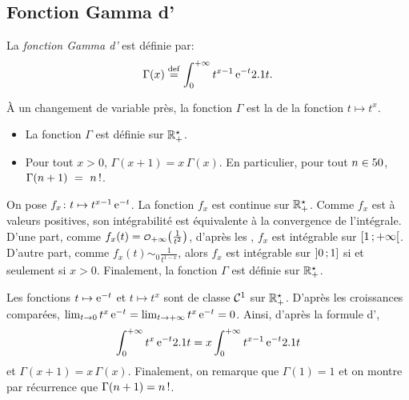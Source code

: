 \subsection{Fonction Gamma d'}\label{subsec:FonctionGammaEuler}

%    

\begin{defi}
    La \emph{fonction Gamma d'} est définie par: 
    $$\Gamma(x) \defeq \int_{0}^{+\infty} t^{x-1} \, \e^{-t} \d t.$$
\end{defi}

\begin{remarque}
    À un changement de variable près, la fonction $\Gamma$ est la  de la fonction $t \mapsto t^x$. 
\end{remarque} 

\begin{theo}
\begin{itemize}
\item La fonction $\Gamma$ est définie sur $\Rpe$.
\item Pour tout $x > 0$, $\Gamma(x+1) = x \, \Gamma(x)$.
En particulier, pour tout $n \in \N$, $\Gamma(n+1)~=~\fact{n}$. 
\end{itemize}
\end{theo}

\begin{demo}
On pose $\fonctionligne[f_x]{t}{t^{x - 1} \, \e^{-t}}$. La fonction $f_x$ est continue sur $\Rpe$. Comme $f_x$ est à valeurs positives, son intégrabilité est équivalente à la convergence de l'intégrale. \\
D'une part, comme $f_x(t) = \petito_{+\infty}\mathopen{}\left(\frac{1}{t^2}\right)$, d'après les , $f_x$ est intégrable sur $\interfo{1}{+\infty}$. D'autre part, comme $f_x(t) \sim_0 \frac{1}{t^{1-x}}$, alors $f_x$ est intégrable sur $\interof{0}{1}$ si et seulement si $x > 0$. Finalement, la fonction $\Gamma$ est définie sur $\Rpe$. 

Les fonctions $t \mapsto \e^{-t}$ et $t \mapsto t^x$ sont de classe $\Cont^1$ sur $\Rpe$. D'après les croissances comparées, $\lim_{t\to0} t^x \, \e^{-t} = \lim_{t\to+\infty} t^x \, \e^{-t} = 0$. Ainsi, d'après la formule d',
\[
\int_0^{+\infty} t^x \, \e^{-t} \d t = x \int_0^{+\infty} t^{x-1} \, \e^{-t} \d t
\]
et $\Gamma(x+1) = x \, \Gamma(x)$. Finalement, on remarque que $\Gamma(1) = 1$ et on montre par récurrence que $\Gamma(n+1) = \fact{n}$.
\end{demo}

